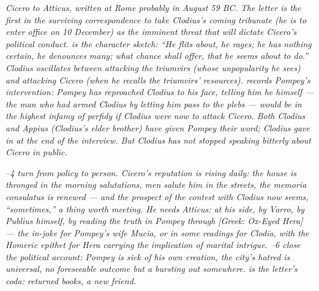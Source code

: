 
\textit{Cicero to Atticus, written at Rome probably in
August 59 BC. The letter is the first in the surviving
correspondence to take Clodius's coming tribunate (he is to
enter office on 10 December) as the imminent threat that
will dictate Cicero's political conduct.  is the
character sketch: ``He flits about, he rages; he has nothing
certain, he denounces many; what chance shall offer, that he
seems about to do.'' Clodius oscillates between attacking the
triumvirs (whose unpopularity he sees) and attacking Cicero
(when he recalls the triumvirs' resources). 
records Pompey's intervention: Pompey has reproached Clodius
to his face, telling him he himself --- the man who had armed
Clodius by letting him pass to the plebs --- would be in the
highest infamy of perfidy if Clodius were now to attack
Cicero. Both Clodius and Appius (Clodius's elder brother) have
given Pompey their word; Clodius gave in at the end of the
interview. But Clodius has not stopped speaking bitterly
about Cicero in public.}

\textit{--4 turn from policy to person. Cicero's
reputation is rising daily: the house is thronged in the
morning salutations, men salute him in the streets, the
\textit{memoria consulatus} is renewed --- and the prospect of
the contest with Clodius now seems, ``sometimes,'' a thing
worth meeting. He needs Atticus: at his side, by Varro, by
Publius himself, by reading the truth in Pompey through
\textit{[Greek: Ox-Eyed Hera]} --- the in-joke for Pompey's
wife Mucia, or in some readings for Clodia, with the
Homeric epithet for Hera carrying the implication of marital
intrigue. --6 close the political account:
Pompey is sick of his own creation, the city's hatred is
universal, no foreseeable outcome but a bursting out somewhere.
 is the letter's coda: returned books, a new
friend.}
